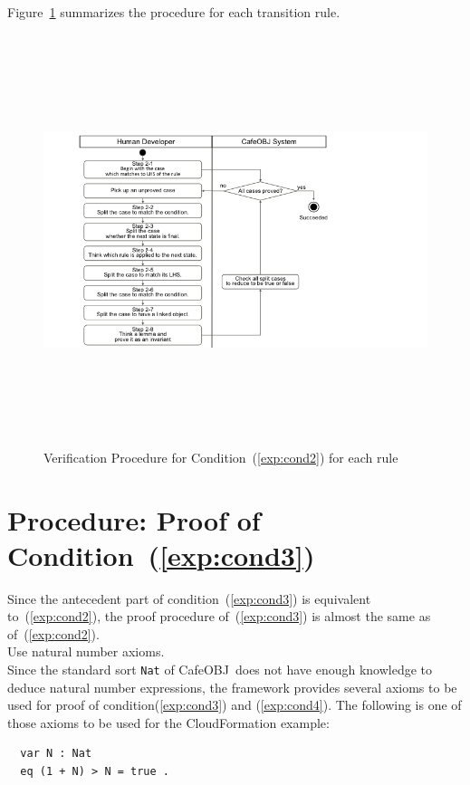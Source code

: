 \documentclass[12pt]{report}
\newcommand{\cafeobj}{{\sf CafeOBJ}~}
\begin{document}
Figure~\ref{fig:procedure2} summarizes the procedure for each transition rule.
\begin{figure}
\centering
\includegraphics[height=12cm,natwidth=720,natheight=405,clip,trim=60 0 180 0]{procedure2.png}
\caption{Verification Procedure for Condition~(\ref{exp:cond2}) for each rule}
\label{fig:procedure2}
\end{figure}

\section{Procedure: Proof of Condition~(\ref{exp:cond3})}
\label{sec:mesmes}
Since the antecedent part of condition~(\ref{exp:cond3}) is equivalent
to~(\ref{exp:cond2}), the proof procedure of~(\ref{exp:cond3}) is
almost the same as of~(\ref{exp:cond2}). \\

 Use natural number axioms. \\
Since the standard sort {\tt Nat} of \cafeobj does not have enough
knowledge to deduce natural number expressions, the framework provides
several axioms to be used for proof of condition(\ref{exp:cond3}) and
(\ref{exp:cond4}).  The following is one of those axioms to be used
for the CloudFormation example:
\small
\begin{verbatim}
  var N : Nat
  eq (1 + N) > N = true .
\end{verbatim}
\normalsize
\end{document}
